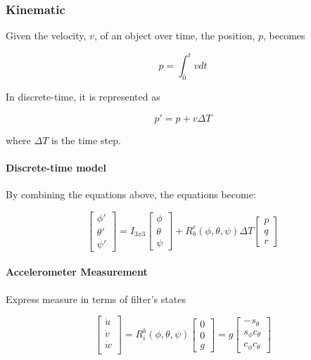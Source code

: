 \documentclass[]{article}
\begin{document}
\subsubsection{Kinematic}
Given the velocity, $v$, of an object over time, the position, $p$, becomes

\begin{equation}
p = \int_0^t v dt
\end{equation}

In discrete-time, it is represented as

\begin{equation}
p' = p + v \Delta T
\end{equation}

where $\Delta T$ is the time step.


\paragraph*{Discrete-time model}
By combining the equations above, the equations become:

\begin{equation}
	\begin{bmatrix}
		\phi' \\
		\theta' \\
		\psi'
	\end{bmatrix} = I_{3x3} 
	\begin{bmatrix}
		\phi \\
		\theta \\
		\psi
	\end{bmatrix} + 
	R_b^e(\phi, \theta, \psi)
	\Delta T
	\begin{bmatrix}
		p \\
		q \\
		r
	\end{bmatrix}
\end{equation}

\paragraph{Accelerometer Measurement}
Express measure in terms of filter's states

\begin{equation}
	\begin{bmatrix}
		\dot{u} \\
		\dot{v} \\
		\dot{w} \\
	\end{bmatrix} = 
	R_{i}^{b}(\phi, \theta, \psi)
	\begin{bmatrix}
		0 \\
		0 \\
		g
	\end{bmatrix} = g
	\begin{bmatrix}
		-s_\theta \\
		s_\phi c_\theta \\
		c_\phi c_\theta
	\end{bmatrix}\label{eqn:accelerometer_measurement_equation}
\end{equation}
\end{document}
